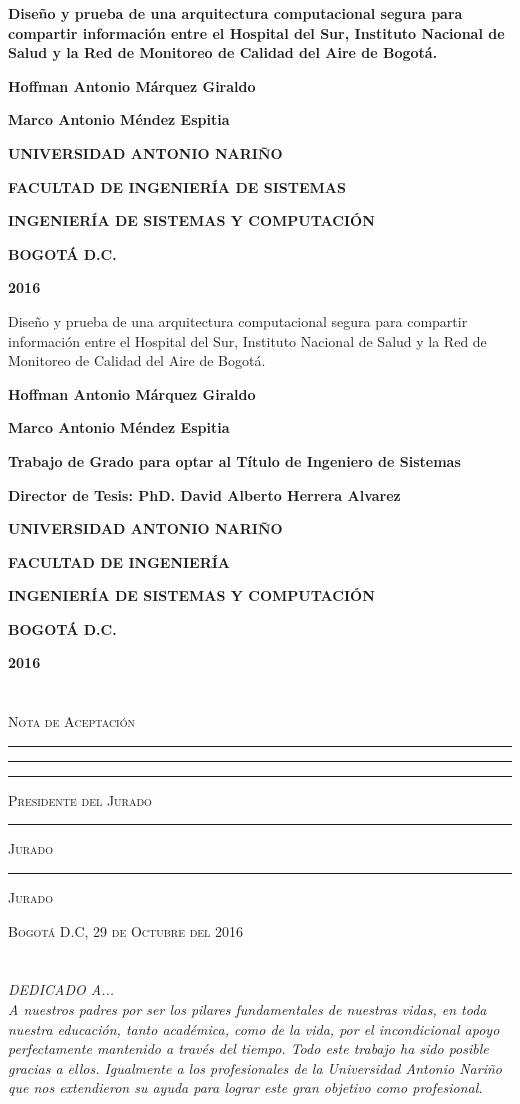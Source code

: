 \documentclass[a4paper,openright,12pt]{book}
\theoremstyle{definition}
\theoremstyle{remark}
\newcommand\portada{
\begin{titlepage}
		\begin{center}
			{\large \bf Diseño y prueba de una arquitectura computacional segura para compartir información entre el Hospital del Sur, Instituto Nacional de Salud y la Red de Monitoreo de Calidad del Aire de Bogotá.}
            
			\vfill
            {\large\bf Hoffman Antonio Márquez Giraldo\par}
 			{\large\bf Marco Antonio Méndez Espitia\par}            
            \vfill
			{\large\bf UNIVERSIDAD ANTONIO NARIÑO  \par}
			{\large\bf FACULTAD DE INGENIERÍA DE SISTEMAS \par}
			{\large\bf INGENIERÍA DE SISTEMAS Y COMPUTACIÓN \par}
			{\large\bf BOGOTÁ D.C.\par}
			{\large\bf 2016 \par}
		\end{center}
\end{titlepage}
}
\newcommand\contraportada{
	\begin{titlepage}
		\begin{center}
{Diseño y prueba de una arquitectura computacional segura para compartir información entre el Hospital del Sur, Instituto Nacional de Salud y la Red de Monitoreo de Calidad del Aire de Bogotá.} 
			\vfill
            {\large\bf Hoffman Antonio Márquez Giraldo\par}
			{\large\bf Marco Antonio Méndez Espitia \par}            
			\vfill            
             {\large\bf Trabajo de Grado para optar al Título de Ingeniero de Sistemas \par}
             \vfill
			{\large\bf Director de Tesis: PhD. David Alberto Herrera Alvarez \par}
			\vfill
			{\large\bf UNIVERSIDAD ANTONIO NARIÑO \par}
			{\large\bf FACULTAD DE INGENIERÍA \par}
			{\large\bf INGENIERÍA DE SISTEMAS Y COMPUTACIÓN \par}
			{\large\bf BOGOTÁ D.C.\par}
			{\large\bf 2016 \par}
		\end{center}
\end{titlepage}
}
\begin{document}
\portada
\contraportada

\chapter*{}
\begin{flushright}
\begingroup

\centering

\textsc{Nota de Aceptación}

\vspace{2em}

\rule[1em]{20em}{0.2pt}
\rule[1em]{20em}{0.2pt}

\vspace{4em}

\rule[1em]{20em}{0.5pt}

\textsc{Presidente del Jurado}

\vspace{2em}

\rule[1em]{20em}{0.5pt}

\textsc{Jurado}

\vspace{2em}

\rule[1em]{20em}{0.5pt}

\textsc{Jurado}

\vspace{3em}

\textsc{Bogotá D.C, 29 de Octubre del 2016}

\endgroup
\end{flushright}


\chapter*{}
\begin{flushright}
\textit{DEDICADO A... \\
A nuestros padres por ser los pilares fundamentales de nuestras vidas, en toda nuestra educación, tanto académica, como de la vida, por el incondicional apoyo perfectamente mantenido a través del tiempo. Todo este trabajo ha sido posible gracias a ellos. Igualmente a los profesionales de la Universidad Antonio Nariño que nos extendieron su ayuda para lograr este gran objetivo como profesional. }
\end{flushright}

\end{document}
